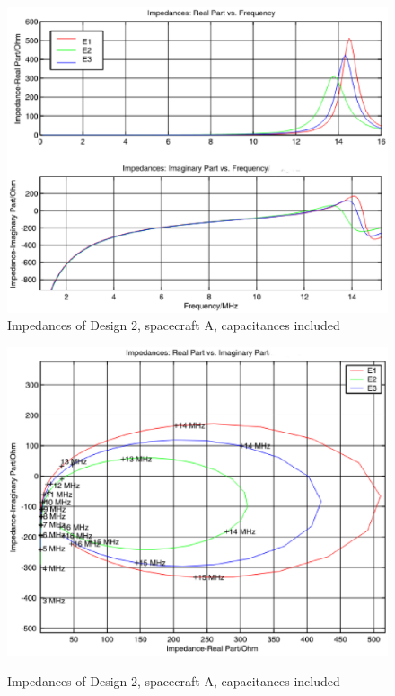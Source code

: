 \documentclass[a4paper,14pt]{extbook}
\begin{document}
\begin{figure}
\begin{center}
\includegraphics[scale=0.65]{ImpedancesD21_caps.eps}\\
\caption{Impedances of Design 2, spacecraft A, capacitances included} \label{fig_Impedance1_D2_caps}
\includegraphics[scale=0.65]{ImpedancesD22_caps.eps} \\
\caption{Impedances of Design 2, spacecraft A, capacitances included} \label{fig_Impedance2_D2_caps}
\end{center}
\end{figure}
\end{document}
